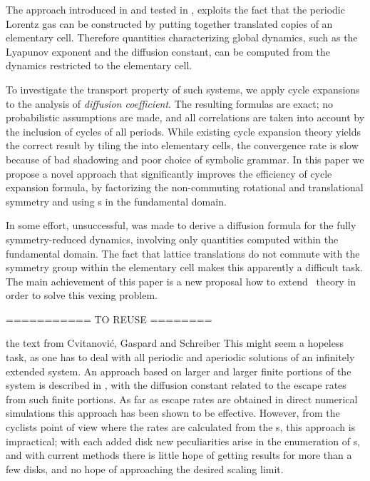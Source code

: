 The approach introduced in  and tested in
, exploits the fact that the periodic Lorentz gas can be
constructed by putting together translated copies of an elementary cell.
Therefore quantities characterizing global dynamics, such as the Lyapunov
exponent and the diffusion constant, can be computed from the dynamics
restricted to the elementary cell.

To investigate the transport property of such systems, we apply cycle
expansions to the analysis of {\em diffusion coefficient}.
The resulting formulas are exact; no probabilistic assumptions are made,
and all correlations are taken into account by the  inclusion of cycles
of all periods. While existing cycle expansion theory yields the correct
result by tiling the {\statesp} into elementary cells, the convergence
rate is slow because of bad shadowing and poor choice of symbolic
grammar. In this paper we propose a novel approach that
significantly improves the efficiency of cycle expansion formula, by
factorizing the non-commuting rotational and translational symmetry and
using \po s in the fundamental domain.

In  some effort, unsuccessful, was made to derive a
diffusion formula for the fully symmetry-reduced dynamics, involving only
quantities computed within the fundamental domain. The fact that lattice
translations do not commute with the symmetry group within the elementary
cell makes this apparently a difficult task. The main achievement of this
paper is a new proposal how to extend \po\ theory in order to solve this
vexing problem.



\bigskip
=========== TO REUSE ========


\bigskip

    {the text from Cvitanovi\'c, Gaspard and Schreiber}
This might seem a hopeless task, as one
has to deal with all periodic and aperiodic
solutions of an infinitely extended system. An
approach based on larger and larger finite portions of the system is described
in , with the diffusion constant related to
the escape rates from such finite portions.
As far as escape rates are obtained in direct numerical simulations
this approach has been shown to be effective.
However, from the cyclists point of view
where the rates are calculated from the \po s,
this approach is impractical; with each added disk new peculiarities arise
in the enumeration of \po s, and with current
methods there is little hope of getting results for more than a few disks,
and no hope of approaching the desired scaling limit.

